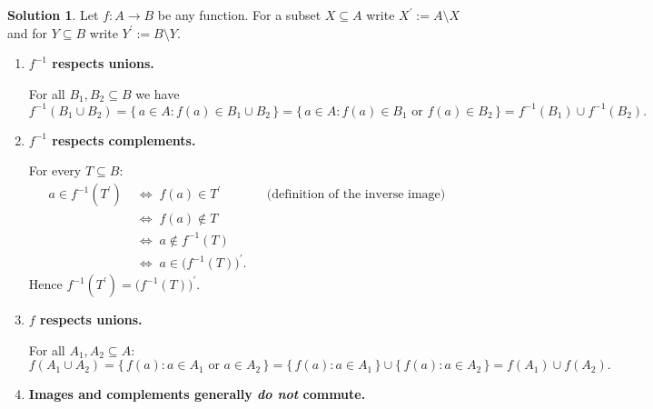 \documentclass[12pt]{article}
\theoremstyle{definition} %
\newtheorem{solution}{Solution}
\theoremstyle{plain} %
\begin{document}
    \begin{solution}
      Let \(f:A\to B\) be any function.  
      For a subset \(X\subseteq A\) write \(X^{\prime}:=A\setminus X\)  
      and for \(Y\subseteq B\) write \(Y^{\prime}:=B\setminus Y\).
      
      \begin{enumerate}[label=(\alph*)]
      
      \item \textbf{\(f^{-1}\) respects unions.}
      
      For all \(B_{1},B_{2}\subseteq B\) we have
      \[
          f^{-1}(B_{1}\cup B_{2})
          =\{\,a\in A : f(a)\in B_{1}\cup B_{2}\,\}
          =\{\,a\in A : f(a)\in B_{1}\text{ or }f(a)\in B_{2}\,\}
          =f^{-1}(B_{1})\cup f^{-1}(B_{2}).
      \]
      
      \item \textbf{\(f^{-1}\) respects complements.}
      
      For every \(T\subseteq B\):
      \[
          \begin{aligned}
              a\in f^{-1}(T^{\prime})
              &\;\Longleftrightarrow\;
              f(a)\in T^{\prime}
              &&\text{(definition of the inverse image)}\\
              &\;\Longleftrightarrow\;
              f(a)\notin T\\
              &\;\Longleftrightarrow\;
              a\notin f^{-1}(T)\\
              &\;\Longleftrightarrow\;
              a\in\bigl(f^{-1}(T)\bigr)^{\prime}.
          \end{aligned}
      \]
      Hence \(f^{-1}(T^{\prime})=\bigl(f^{-1}(T)\bigr)^{\prime}\).
      
      \item \textbf{\(f\) respects unions.}
      
      For all \(A_{1},A_{2}\subseteq A\):
      \[
          f(A_{1}\cup A_{2})
          =\{\,f(a):a\in A_{1}\text{ or }a\in A_{2}\,\}
          =\{\,f(a):a\in A_{1}\,\}\cup\{\,f(a):a\in A_{2}\,\}
          =f(A_{1})\cup f(A_{2}).
      \]
      
      \item \textbf{Images and complements generally \emph{do not} commute.}
      

\end{enumerate}
\end{solution}
\end{document}
